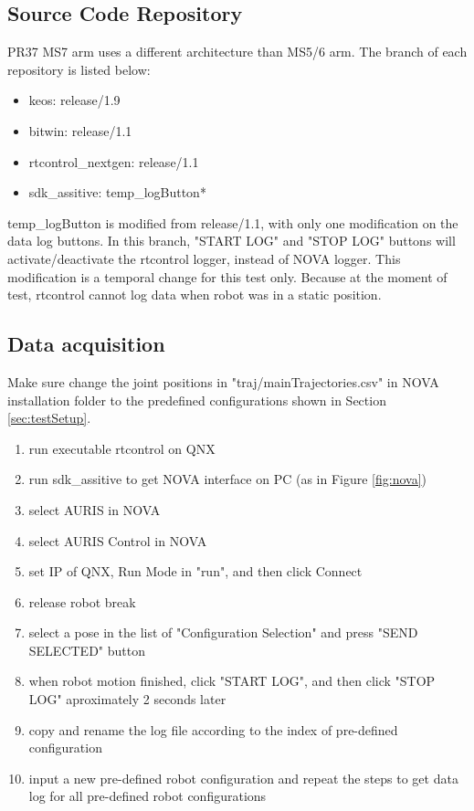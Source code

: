 \subsection{Source Code Repository}
PR37 MS7 arm uses a different architecture than MS5/6 arm. The branch of each repository is listed below:
\begin{itemize}
	\item keos: release/1.9
	\item bitwin: release/1.1
	\item rtcontrol\_nextgen: release/1.1
	\item sdk\_assitive: temp\_logButton* 
\end{itemize}

temp\_logButton is modified from release/1.1, with only one modification on the data log buttons. In this branch, "START LOG" and "STOP LOG" buttons will activate/deactivate the rtcontrol logger, instead of NOVA logger. This modification is a temporal change for this test only. Because at the moment of test, rtcontrol cannot log data when robot was in a static position.

\subsection{Data acquisition}
Make sure change the joint positions in "traj/mainTrajectories.csv" in NOVA installation folder to the predefined configurations shown in Section \ref{sec:testSetup}.
\begin{enumerate}
	\item run executable rtcontrol on QNX
	\item run sdk\_assitive to get NOVA interface on PC (as in Figure \ref{fig:nova})
	\item select AURIS in NOVA
	\item select AURIS Control in NOVA
	\item set IP of QNX, Run Mode in "run", and then click Connect
	\item release robot break
	\item select a pose in the list of "Configuration Selection" and press "SEND SELECTED" button
	\item when robot motion finished, click "START LOG", and then click "STOP LOG" aproximately 2 seconds later
	\item copy and rename the log file according to the index of pre-defined configuration
	\item input a new pre-defined robot configuration and repeat the steps to get data log for all pre-defined robot configurations
\end{enumerate}

